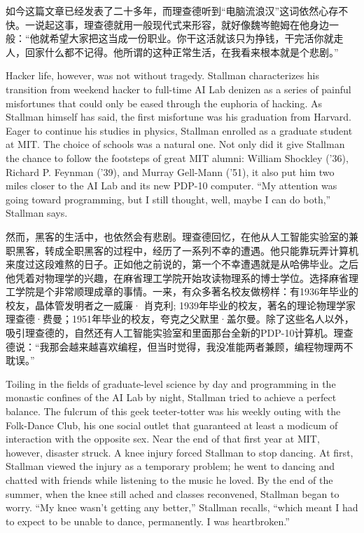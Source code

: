 \ifdefined\chs
如今这篇文章已经发表了二十多年，而理查德听到“电脑流浪汉”这词依然心存不快。一说起这事，理查德就用一般现代式来形容，就好像魏岑鲍姆在他身边一般：“他就希望大家把这当成一份职业。你干这活就该只为挣钱，干完活你就走人，回家什么都不记得。他所谓的这种正常生活，在我看来根本就是个悲剧。”
\fi

\ifdefined\eng
Hacker life, however, was not without tragedy. Stallman characterizes his transition from weekend hacker to full-time AI Lab denizen as a series of painful misfortunes that could only be eased through the euphoria of hacking. As Stallman himself has said, the first misfortune was his graduation from Harvard. Eager to continue his studies in physics, Stallman enrolled as a graduate student at MIT. The choice of schools was a natural one. Not only did it give Stallman the chance to follow the footsteps of great MIT alumni: William Shockley ('36), Richard P. Feynman ('39), and Murray Gell-Mann ('51), it also put him two miles closer to the AI Lab and its new PDP-10 computer. ``My attention was going toward programming, but I still thought, well, maybe I can do both,'' Stallman says.
\fi

\ifdefined\chs
然而，黑客的生活中，也依然会有悲剧。理查德回忆，在他从人工智能实验室的兼职黑客，转成全职黑客的过程中，经历了一系列不幸的遭遇。他只能靠玩弄计算机来度过这段难熬的日子。正如他之前说的，第一个不幸遭遇就是从哈佛毕业。之后他凭着对物理学的兴趣，在麻省理工学院开始攻读物理系的博士学位。选择麻省理工学院是个非常顺理成章的事情。一来，有众多著名校友做榜样：有1936年毕业的校友，晶体管发明者之一威廉· 肖克利; 1939年毕业的校友，著名的理论物理学家理查德·费曼；1951年毕业的校友，夸克之父默里·盖尔曼。除了这些名人以外，吸引理查德的，自然还有人工智能实验室和里面那台全新的PDP-10计算机。理查德说：“我那会越来越喜欢编程，但当时觉得，我没准能两者兼顾，编程物理两不耽误。”
\fi

\ifdefined\eng
Toiling in the fields of graduate-level science by day and programming in the monastic confines of the AI Lab by night, Stallman tried to achieve a perfect balance. The fulcrum of this geek teeter-totter was his weekly outing with the Folk-Dance Club, his one social outlet that guaranteed at least a modicum of interaction with the opposite sex. Near the end of that first year at MIT, however, disaster struck. A knee injury forced Stallman to stop dancing. At first, Stallman viewed the injury as a temporary problem; he went to dancing and chatted with friends while listening to the music he loved. By the end of the summer, when the knee still ached and classes reconvened, Stallman began to worry. ``My knee wasn't getting any better,'' Stallman recalls, ``which meant I had to expect to be unable to dance, permanently. I was heartbroken.''
\fi

